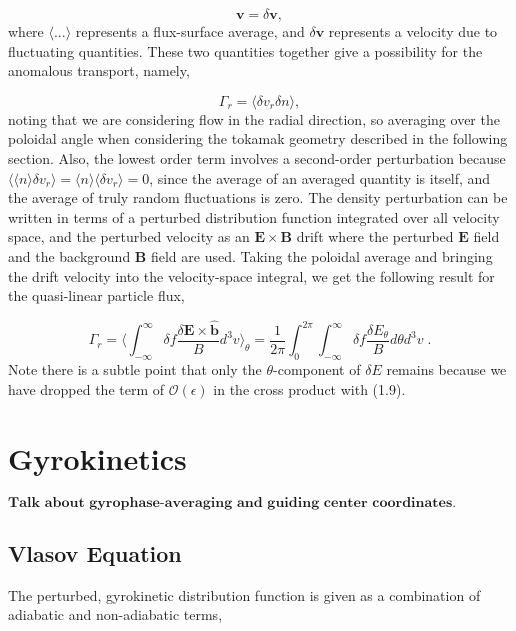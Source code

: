 \documentclass[12pt]{article}
\numberwithin{equation}{section}
\begin{document}
   \begin{equation}
      \bm{v} = \delta \bm{v},
   \end{equation}
where $\langle ... \rangle$ represents a flux-surface average, and $\delta \bm{v}$ represents a velocity due to fluctuating quantities.
These two quantities together give a possibility for the anomalous transport, namely,
   
   \begin{equation}
      \Gamma_r = \langle\delta v_r \delta n\rangle,
   \end{equation}
noting that we are considering flow in the radial direction, so averaging over the poloidal angle when considering the tokamak
geometry described in the following section. Also, the lowest order term involves a second-order perturbation because
$\langle \langle n \rangle \delta v_r \rangle = \langle n \rangle \langle \delta v_r \rangle = 0$, since the average of an averaged
quantity is itself, and the average of truly random fluctuations is zero. The density perturbation can be written in terms of a
perturbed distribution function integrated over all velocity space, and the perturbed velocity as an $\bm{E}\times\bm{B}$ drift
where the perturbed $\bm{E}$ field and the background $\bm{B}$ field are used. Taking the poloidal average and bringing the drift
velocity into the velocity-space integral, we get the following result for the quasi-linear particle flux,
   
   \begin{equation}
      \Gamma_r = \langle\int_{-\infty}^{\infty}\delta f \frac{\delta\bm{E}\times\bm{\hat{b}}}{B} d^{3}v\rangle_\theta
               = \frac{1}{2\pi}\int_{0}^{2\pi} \int_{-\infty}^{\infty}\delta f \frac{\delta E_\theta}{B}d\theta d^{3}v \;.
   \end{equation}
Note there is a subtle point that only the $\theta$-component of $\delta E$ remains because we have dropped the term of
$\mathcal{O}(\epsilon)$ in the cross product with (1.9). 


\section{Gyrokinetics}
   \quad $\textbf{Talk about gyrophase-averaging and guiding center coordinates.}$

\subsection{Vlasov Equation}
   \quad The perturbed, gyrokinetic distribution function is given as a combination of adiabatic
and non-adiabatic terms\cite{FriemanChen},
\end{document}

